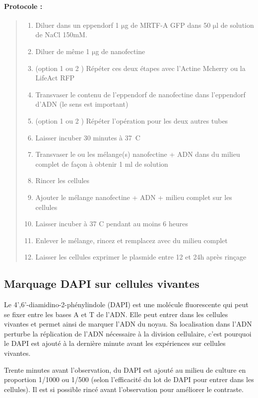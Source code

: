 \documentclass{report}
\newcommand{\micro}{$\mathrm{\mu}$}
\begin{document}
\paragraph{Protocole : }
\begin{quote}
\begin{enumerate}
	\item Diluer dans un eppendorf 1 \micro g de MRTF-A GFP dans 50 \micro l de solution de NaCl 150mM. 
	\item Diluer de même 1 \micro g de nanofectine
	\item (option 1 ou 2 ) Répéter ces deux étapes avec l'Actine Mcherry ou la LifeAct RFP
	\item Transvaser le contenu de l'eppendorf de nanofectine dans l'eppendorf d'ADN (le sens est important)
	\item (option 1 ou 2 ) Répéter l'opération pour les deux autres tubes
	\item Laisser incuber 30 minutes à 37~\degres C 
	\item Transvaser le ou les mélange(s) nanofectine + ADN dans du milieu complet de façon à obtenir 1  ml de solution
	\item Rincer les cellules
	\item Ajouter le mélange nanofectine + ADN + milieu complet sur les cellules
	\item Laisser incuber à 37 \degres C pendant au moins 6 heures
	\item Enlever le mélange, rincez et remplacez avec du milieu complet
	\item Laisser les cellules exprimer le plasmide entre 12 et 24h après rinçage
\end{enumerate}
\end{quote}

	\subsection{Marquage DAPI sur cellules vivantes}
	
	Le  4',6'-diamidino-2-phénylindole (DAPI) est une molécule fluorescente qui peut se fixer entre les bases A et T de l'ADN. Elle peut entrer dans les cellules vivantes et permet ainsi de marquer l'ADN du noyau. Sa localisation dans l'ADN perturbe la réplication de l'ADN nécessaire à la division cellulaire, c'est pourquoi le DAPI est ajouté à la dernière minute avant les expériences sur cellules vivantes. 
	
	Trente minutes avant l'observation, du DAPI est ajouté au milieu de culture en proportion 1/1000 ou 1/500 (selon l'efficacité du lot de DAPI pour entrer dans les cellules). Il est si possible rincé avant l'observation pour améliorer le contraste. 
\end{document}
